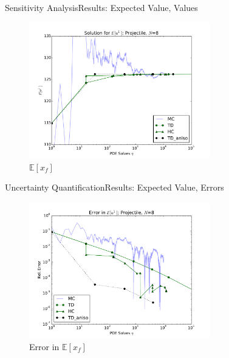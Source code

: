 \documentclass{beamer}
\newcommand{\expv}[1]{\ensuremath{\mathbb{E}[ #1]}}
\begin{document}
\begin{frame}{Sensitivity Analysis}{Results: Expected Value, Values}
  \begin{figure}[h!]
    \centering
      \includegraphics[width=0.7\textwidth]{../graphics/projectile_solns_aniso}
      \caption{$\expv{x_f}$}
  \end{figure}
\end{frame}

\begin{frame}{Uncertainty Quantification}{Results: Expected Value, Errors}
  \begin{figure}[h!]
    \centering
      \includegraphics[width=0.7\textwidth]{../graphics/projectile_errs_aniso}
      \caption{Error in $\expv{x_f}$}
  \end{figure}
\end{frame}
\end{document}
